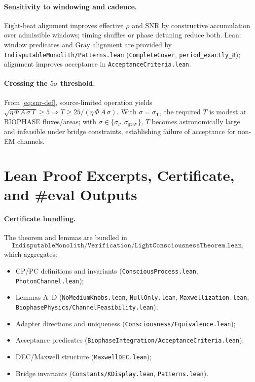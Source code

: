 \documentclass[12pt,a4paper]{article}
\begin{document}
\paragraph{Sensitivity to windowing and cadence.}
Eight-beat alignment improves effective \(\rho\) and \(\mathrm{SNR}\) by constructive accumulation over admissible windows; timing shuffles or phase detuning reduce both. Lean: window predicates and Gray alignment are provided by \texttt{IndisputableMonolith/Patterns.lean} (\texttt{CompleteCover}, \texttt{period\_exactly\_8}); alignment improves acceptance in \texttt{AcceptanceCriteria.lean}.

\paragraph{Crossing the \(5\sigma\) threshold.}
From \eqref{eq:snr-def}, source-limited operation yields
\(
  \sqrt{\eta\,\Phi\,A\,\sigma\,T}\ge 5
  \Rightarrow
  T \ge 25 / (\eta\,\Phi\,A\,\sigma).
\)
With \(\sigma=\sigma_{\mathrm{T}}\), the required \(T\) is modest at BIOPHASE fluxes/areas; with \(\sigma\in\{\sigma_{\nu},\sigma_{\mathrm{grav}}\}\), \(T\) becomes astronomically large and infeasible under bridge constraints, establishing failure of acceptance for non-EM channels.


\section{Lean Proof Excerpts, Certificate, and \texorpdfstring{\#eval}{\#eval} Outputs}
\label{app:lean-excerpts}

\paragraph{Certificate bundling.}
The theorem and lemmas are bundled in
\[
  \texttt{IndisputableMonolith/Verification/LightConsciousnessTheorem.lean},
\]
which aggregates:
\begin{itemize}
  \item CP/PC definitions and invariants (\texttt{ConsciousProcess.lean}, \texttt{PhotonChannel.lean});
  \item Lemmas A–D (\texttt{NoMediumKnobs.lean}, \texttt{NullOnly.lean}, \texttt{Maxwellization.lean}, \texttt{BiophasePhysics/ChannelFeasibility.lean});
  \item Adapter directions and uniqueness (\texttt{Consciousness/Equivalence.lean});
  \item Acceptance predicates (\texttt{BiophaseIntegration/AcceptanceCriteria.lean});
  \item DEC/Maxwell structure (\texttt{MaxwellDEC.lean});
  \item Bridge invariants (\texttt{Constants/KDisplay.lean}, \texttt{Patterns.lean}).
\end{itemize}
\end{document}
